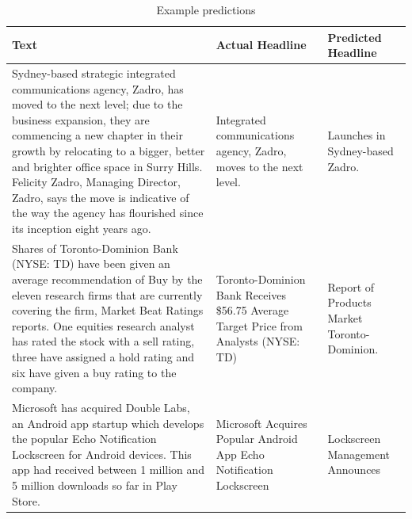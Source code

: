 \begin{center}
\begin{table}[!htb]
\centering
\caption{Example predictions}
\label{tab:results-table}
\begin{tabular}{|l|l|l|}
\hline
\textbf{Text} & \textbf{Actual Headline} & \textbf{Predicted Headline} \\ \hline

\begin{minipage}[t]{0.4\columnwidth}%
Sydney-based strategic integrated communications agency, Zadro, has moved to the next level; due to the business expansion, they are commencing a new chapter in their growth by relocating to a bigger, better and brighter office space in Surry Hills. Felicity Zadro, Managing Director, Zadro, says the move is indicative of the way the agency has flourished since its inception eight years ago.             
\end{minipage}
 & 
\begin{minipage}[t]{0.3\columnwidth}%
 Integrated communications agency, Zadro, moves to the next level. 
\end{minipage}
 & 
\begin{minipage}[t]{0.3\columnwidth}%
 Launches in Sydney-based Zadro. 
\end{minipage}  \\ \hline

\begin{minipage}[t]{0.4\columnwidth}%
Shares of Toronto-Dominion Bank (NYSE: TD) have been given an average recommendation of Buy by the eleven research firms that are currently covering the firm, Market Beat Ratings reports. One equities research analyst has rated the stock with a sell rating, three have assigned a hold rating and six have given a buy rating to the company.           
\end{minipage}
 & 
\begin{minipage}[t]{0.3\columnwidth}%
Toronto-Dominion Bank Receives \$56.75 Average Target Price from Analysts (NYSE: TD) 
\end{minipage}
 & 
\begin{minipage}[t]{0.3\columnwidth}%
Report of Products Market Toronto-Dominion. 
\end{minipage}  \\ \hline

\begin{minipage}[t]{0.4\columnwidth}%
Microsoft has acquired Double Labs, an Android app startup which develops the popular Echo Notification Lockscreen for Android devices. This app had received between 1 million and 5 million downloads so far in Play Store.          
\end{minipage}
 & 
\begin{minipage}[t]{0.3\columnwidth}%
Microsoft Acquires Popular Android App Echo Notification Lockscreen
\end{minipage}
 & 
\begin{minipage}[t]{0.3\columnwidth}%
Lockscreen Management Announces
\end{minipage}  \\ \hline


\end{tabular}
\end{table}
\end{center}

